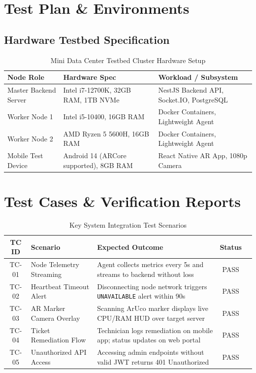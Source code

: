 \section{Test Plan \& Environments}

\subsection{Hardware Testbed Specification}
\begin{table}[H]
    \centering
    \caption{Mini Data Center Testbed Cluster Hardware Setup}
    \begin{tabular}{|l|l|p{6cm}|}
        \hline
        \textbf{Node Role} & \textbf{Hardware Spec} & \textbf{Workload / Subsystem} \\ \hline
        Master Backend Server & Intel i7-12700K, 32GB RAM, 1TB NVMe & NestJS Backend API, Socket.IO, PostgreSQL \\ \hline
        Worker Node 1 & Intel i5-10400, 16GB RAM & Docker Containers, Lightweight Agent \\ \hline
        Worker Node 2 & AMD Ryzen 5 5600H, 16GB RAM & Docker Containers, Lightweight Agent \\ \hline
        Mobile Test Device & Android 14 (ARCore supported), 8GB RAM & React Native AR App, 1080p Camera \\ \hline
    \end{tabular}
\end{table}

\section{Test Cases \& Verification Reports}
\begin{table}[H]
    \centering
    \caption{Key System Integration Test Scenarios}
    \begin{tabular}{|c|p{4cm}|p{5cm}|c|c|}
        \hline
        \textbf{TC ID} & \textbf{Scenario} & \textbf{Expected Outcome} & \textbf{Status} \\ \hline
        TC-01 & Node Telemetry Streaming & Agent collects metrics every 5s and streams to backend without loss & PASS \\ \hline
        TC-02 & Heartbeat Timeout Alert & Disconnecting node network triggers \texttt{UNAVAILABLE} alert within 90s & PASS \\ \hline
        TC-03 & AR Marker Camera Overlay & Scanning ArUco marker displays live CPU/RAM HUD over target server & PASS \\ \hline
        TC-04 & Ticket Remediation Flow & Technician logs remediation on mobile app; status updates on web portal & PASS \\ \hline
        TC-05 & Unauthorized API Access & Accessing admin endpoints without valid JWT returns 401 Unauthorized & PASS \\ \hline
    \end{tabular}
\end{table}
